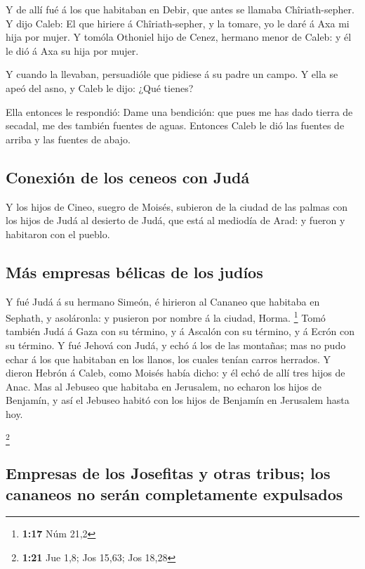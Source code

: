  Y de allí fué á los que habitaban en Debir, que antes se
llamaba Chîriath-sepher.  Y dijo Caleb: El que hiriere á
Chîriath-sepher, y la tomare, yo le daré á Axa mi hija por mujer.
 Y tomóla Othoniel hijo de Cenez, hermano menor de Caleb:
y él le dió á Axa su hija por mujer.

 Y cuando la llevaban, persuadióle que pidiese á su padre
un campo. Y ella se apeó del asno, y Caleb le dijo: ¿Qué tienes?

 Ella entonces le respondió: Dame una bendición: que pues
me has dado tierra de secadal, me des también fuentes de aguas. Entonces
Caleb le dió las fuentes de arriba y las fuentes de abajo.

\hypertarget{conexiuxf3n-de-los-ceneos-con-juduxe1}{%
\subsection{Conexión de los ceneos con
Judá}\label{conexiuxf3n-de-los-ceneos-con-juduxe1}}

 Y los hijos de Cineo, suegro de Moisés, subieron de la
ciudad de las palmas con los hijos de Judá al desierto de Judá, que está
al mediodía de Arad: y fueron y habitaron con el pueblo.

\hypertarget{muxe1s-empresas-buxe9licas-de-los-juduxedos}{%
\subsection{Más empresas bélicas de los
judíos}\label{muxe1s-empresas-buxe9licas-de-los-juduxedos}}

 Y fué Judá á su hermano Simeón, é hirieron al Cananeo
que habitaba en Sephath, y asoláronla: y pusieron por nombre á la
ciudad, Horma. \footnote{\textbf{1:17} Núm 21,2}  Tomó
también Judá á Gaza con su término, y á Ascalón con su término, y á
Ecrón con su término.  Y fué Jehová con Judá, y echó á
los de las montañas; mas no pudo echar á los que habitaban en los
llanos, los cuales tenían carros herrados.  Y dieron
Hebrón á Caleb, como Moisés había dicho: y él echó de allí tres hijos de
Anac.  Mas al Jebuseo que habitaba en Jerusalem, no
echaron los hijos de Benjamín, y así el Jebuseo habitó con los hijos de
Benjamín en Jerusalem hasta hoy.

\footnote{\textbf{1:21} Jue 1,8; Jos 15,63; Jos 18,28}

\hypertarget{empresas-de-los-josefitas-y-otras-tribus-los-cananeos-no-seruxe1n-completamente-expulsados}{%
\subsection{Empresas de los Josefitas y otras tribus; los cananeos no
serán completamente
expulsados}\label{empresas-de-los-josefitas-y-otras-tribus-los-cananeos-no-seruxe1n-completamente-expulsados}}

